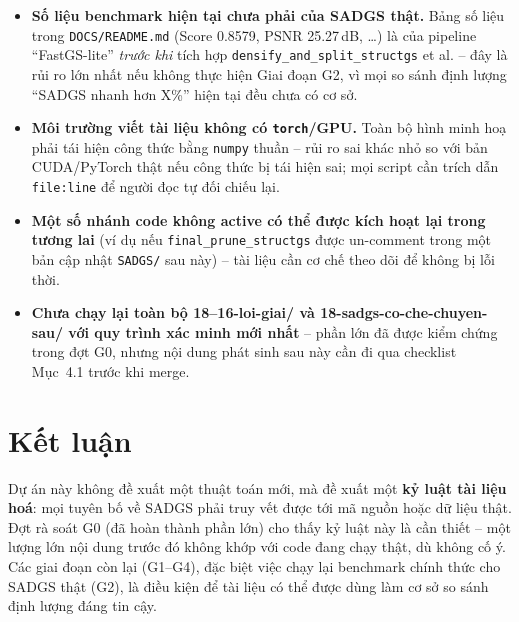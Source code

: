 \documentclass[a4paper,11pt]{article}
\begin{document}
\begin{itemize}[leftmargin=1.2em]
    \item \textbf{Số liệu benchmark hiện tại chưa phải của SADGS thật.} Bảng số liệu trong
    \texttt{DOCS/README.md} (Score 0.8579, PSNR 25.27\,dB, \ldots) là của pipeline
    ``FastGS-lite'' \emph{trước khi} tích hợp \texttt{densify\_and\_split\_structgs} et al. --
    đây là rủi ro lớn nhất nếu không thực hiện Giai đoạn G2, vì mọi so sánh định lượng
    ``SADGS nhanh hơn X\%'' hiện tại đều chưa có cơ sở.
    \item \textbf{Môi trường viết tài liệu không có \texttt{torch}/GPU.} Toàn bộ hình minh
    hoạ phải tái hiện công thức bằng \texttt{numpy} thuần -- rủi ro sai khác nhỏ so với bản
    CUDA/PyTorch thật nếu công thức bị tái hiện sai; mọi script cần trích dẫn \texttt{file:line}
    để người đọc tự đối chiếu lại.
    \item \textbf{Một số nhánh code không active có thể được kích hoạt lại trong tương lai}
    (ví dụ nếu \texttt{final\_prune\_structgs} được un-comment trong một bản cập nhật
    \texttt{SADGS/} sau này) -- tài liệu cần cơ chế theo dõi để không bị lỗi thời.
    \item \textbf{Chưa chạy lại toàn bộ 18--16-loi-giai/ và 18-sadgs-co-che-chuyen-sau/ với
    quy trình xác minh mới nhất} -- phần lớn đã được kiểm chứng trong đợt G0, nhưng nội dung
    phát sinh sau này cần đi qua checklist Mục~4.1 trước khi merge.
\end{itemize}

\section{Kết luận}

Dự án này không đề xuất một thuật toán mới, mà đề xuất một \textbf{kỷ luật tài liệu hoá}: mọi
tuyên bố về SADGS phải truy vết được tới mã nguồn hoặc dữ liệu thật. Đợt rà soát G0 (đã hoàn
thành phần lớn) cho thấy kỷ luật này là cần thiết -- một lượng lớn nội dung trước đó không
khớp với code đang chạy thật, dù không cố ý. Các giai đoạn còn lại (G1--G4), đặc biệt việc
chạy lại benchmark chính thức cho SADGS thật (G2), là điều kiện để tài liệu có thể được dùng
làm cơ sở so sánh định lượng đáng tin cậy.
\end{document}
